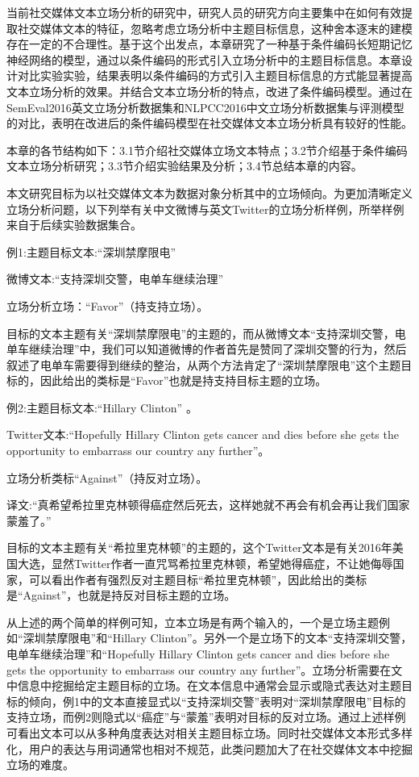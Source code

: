 
当前社交媒体文本立场分析的研究中，研究人员的研究方向主要集中在如何有效提取社交媒体文本的特征，忽略考虑立场分析中主题目标信息，这种舍本逐末的建模存在一定的不合理性。基于这个出发点，本章研究了一种基于条件编码长短期记忆神经网络的模型，通过以条件编码的形式引入立场分析中的主题目标信息。本章设计对比实验实验，结果表明以条件编码的方式引入主题目标信息的方式能显著提高文本立场分析的效果。并结合文本立场分析的特点，改进了条件编码模型。通过在SemEval2016英文立场分析数据集和NLPCC2016中文立场分析数据集与评测模型的对比，表明在改进后的条件编码模型在社交媒体文本立场分析具有较好的性能。

本章的各节结构如下：3.1节介绍社交媒体立场文本特点；3.2节介绍基于条件编码文本立场分析研究；3.3节介绍实验结果及分析；3.4节总结本章的内容。

本文研究目标为以社交媒体文本为数据对象分析其中的立场倾向。为更加清晰定义立场分析问题，以下列举有关中文微博与英文Twitter的立场分析样例，所举样例来自于后续实验数据集合。

例1:主题目标文本:“深圳禁摩限电”

微博文本:“支持深圳交警，电单车继续治理”

立场分析立场：“Favor”（持支持立场）。

目标的文本主题有关“深圳禁摩限电”的主题的，而从微博文本“支持深圳交警，电单车继续治理”中，我们可以知道微博的作者首先是赞同了深圳交警的行为，然后叙述了电单车需要得到继续的整治，从两个方法肯定了“深圳禁摩限电”这个主题目标的，因此给出的类标是“Favor”也就是持支持目标主题的立场。

例2:主题目标文本:“Hillary Clinton” 。

Twitter文本:“Hopefully Hillary Clinton gets cancer and dies before she gets the opportunity to embarrass our country any further”。

立场分析类标“Against”（持反对立场）。

译文:“真希望希拉里克林顿得癌症然后死去，这样她就不再会有机会再让我们国家蒙羞了。”

目标的文本主题有关“希拉里克林顿”的主题的，这个Twitter文本是有关2016年美国大选，显然Twitter作者一直咒骂希拉里克林顿，希望她得癌症，不让她侮辱国家，可以看出作者有强烈反对主题目标“希拉里克林顿”，因此给出的类标是“Against”，也就是持反对目标主题的立场。

从上述的两个简单的样例可知，立本立场是有两个输入的，一个是立场主题例如“深圳禁摩限电”和“Hillary Clinton”。另外一个是立场下的文本“支持深圳交警，电单车继续治理”和“Hopefully Hillary Clinton gets cancer and dies before she gets the opportunity to embarrass our country any further”。立场分析需要在文中信息中挖掘给定主题目标的立场。在文本信息中通常会显示或隐式表达对主题目标的倾向，例1中的文本直接显式以“支持深圳交警”表明对“深圳禁摩限电”目标的支持立场，而例2则隐式以“癌症”与“蒙羞”表明对目标的反对立场。通过上述样例可看出文本可以从多种角度表达对相关主题目标立场。同时社交媒体文本形式多样化，用户的表达与用词通常也相对不规范，此类问题加大了在社交媒体文本中挖掘立场的难度。

